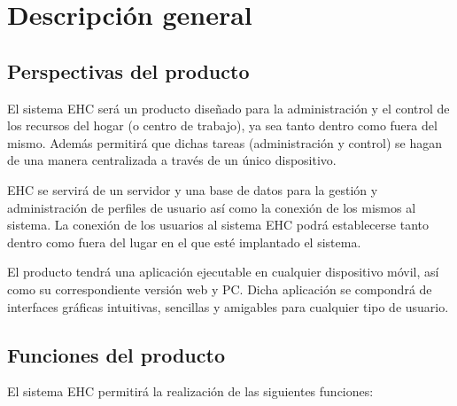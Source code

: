 \chapter{Descripci\'on general}
\section{Perspectivas del producto}
El sistema EHC ser\'a un producto dise\~nado para la administraci\'on y el control de los recursos del hogar (o centro de trabajo), ya sea tanto dentro como fuera del mismo. Adem\'as permitir\'a que dichas tareas (administraci\'on y control) se hagan de una manera centralizada a trav\'es de un único dispositivo.

EHC se servir\'a de un servidor y una base de datos para la gesti\'on y administraci\'on de perfiles de usuario as\'i como la conexi\'on de los mismos al sistema. La conexi\'on de los usuarios al sistema EHC podr\'a establecerse tanto dentro como fuera del lugar en el que est\'e implantado el sistema.

El producto tendr\'a una aplicaci\'on ejecutable en cualquier dispositivo m\'ovil, as\'i como su correspondiente versi\'on web y PC. Dicha aplicaci\'on se compondr\'a de interfaces gr\'aficas intuitivas, sencillas y amigables para cualquier tipo de usuario.

\section{Funciones del producto}

El sistema EHC permitir\'a la realizaci\'on de las siguientes funciones:

